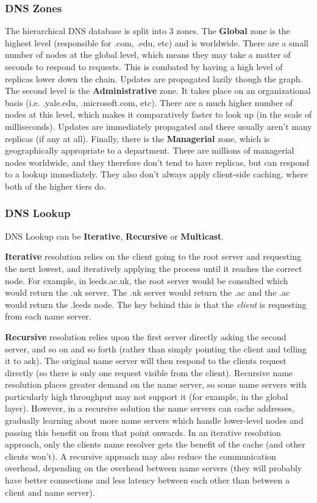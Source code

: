 \documentclass{article}
\begin{document}
\subsubsection{DNS Zones}
The hierarchical DNS database is split into 3 zones. The \textbf{Global} zone is the highest level (responsible for .com, .edu, etc) and is worldwide. There are a small number of nodes at the global level, which means they may take a matter of seconds to respond to requests. This is combated by having a high level of replicas lower down the chain. Updates are propagated lazily though the graph. The second level is the \textbf{Administrative} zone. It takes place on an organizational basis (i.e. .yale.edu, .microsoft.com, etc). There are a much higher number of nodes at this level, which makes it comparatively faster to look up (in the scale of milliseconds). Updates are immediately propagated and there usually aren't many replicas (if any at all). Finally, there is the \textbf{Managerial} zone, which is geographically appropriate to a department. There are millions of managerial nodes worldwide, and they therefore don't tend to have replicas, but can respond to a lookup immediately. They also don't always apply client-side caching, where both of the higher tiers do. 

\subsubsection{DNS Lookup}
DNS Lookup can be \textbf{Iterative}, \textbf{Recursive} or \textbf{Multicast}.

\textbf{Iterative} resolution relies on the client going to the root server and requesting the next lowest, and iteratively applying the process until it reaches the correct node. For example, in leeds.ac.uk, the root server would be consulted which would return the .uk server. The .uk server would return the .ac and the .ac would return the .leeds node. The key behind this is that the \textit{client} is requesting from each name server.

\textbf{Recursive} resolution relies upon the first server directly asking the second server, and so on and so forth (rather than simply pointing the client and telling it to ask). The original name server will then respond to the clients request directly (so there is only one request visible from the client). Recursive name resolution places greater demand on the name server, so some name servers with particularly high throughput may not support it (for example, in the global layer). However, in a recursive solution the name servers can cache addresses, gradually learning about more name servers which handle lower-level nodes and passing this benefit on from that point onwards. In an iterative resolution approach, only the clients name resolver gets the benefit of the cache (and other clients won't). A recursive approach may also reduce the communication overhead, depending on the overhead between name servers (they will probably have better connections and less latency between each other than between a client and name server).
\end{document}
